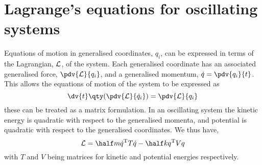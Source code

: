 \section{Lagrange's equations for oscillating systems}
\label{sec:lagrangian}
  Equations of motion in generalised coordinates, $q_i$, can be
  expressed in terms of the Lagrangian, ${\cal L}$, of the
  system. Each generalised coordinate has an associated generalised
  force, $\pdv{{\cal L}}{q_i}$, and a generalised momentum, $\dot{q} =
  \pdv{q_i}{t}$. This allows the equations of motion of the system to
  be expressed as
  \[ \dv{t} \qty( \pdv{{\cal L}}{\dot{q}_i} ) = \pdv{{\cal L}}{q_i} \]
  these can be treated as a matrix formulation. In an oscillating
  system the kinetic energy is quadratic with respect to the
  generalised momenta, and potential is quadratic with respect to the
  generalised coordinates. We thus have,
  \[ {\cal L} = \half m \dot{q}^{\rm T} T \dot{q} - \half k q^{\rm T}
  V q \] with $T$ and $V$ being matrices for kinetic and potential
  energies respectively.


